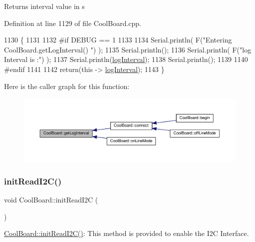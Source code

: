 \begin{DoxyReturn}{Returns}
interval value in s 
\end{DoxyReturn}


Definition at line 1129 of file Cool\+Board.\+cpp.


\begin{DoxyCode}
1130 \{
1131 
1132 \textcolor{preprocessor}{#if DEBUG == 1}
1133 
1134     Serial.println( F(\textcolor{stringliteral}{"Entering CoolBoard.getLogInterval() "}) );
1135     Serial.println();
1136     Serial.println( F(\textcolor{stringliteral}{"log Interval is :"}) );
1137     Serial.println(\hyperlink{class_cool_board_a84bc94413b64973e4aba8c467c97006c}{logInterval});
1138     Serial.println();
1139 
1140 \textcolor{preprocessor}{#endif}
1141 
1142     \textcolor{keywordflow}{return}(\textcolor{keyword}{this} -> \hyperlink{class_cool_board_a84bc94413b64973e4aba8c467c97006c}{logInterval});
1143 \}
\end{DoxyCode}
Here is the caller graph for this function\+:
\nopagebreak
\begin{figure}[H]
\begin{center}
\leavevmode
\includegraphics[width=350pt]{d7/df9/class_cool_board_a7508e029f2ee17bb747ffab599285e0d_icgraph}
\end{center}
\end{figure}
\mbox{\label{class_cool_board_a397b46fadab8f530a8cf4d914c561366}} 
\subsubsection{\texorpdfstring{init\+Read\+I2\+C()}{initReadI2C()}}
{\footnotesize\ttfamily void Cool\+Board\+::init\+Read\+I2C (\begin{DoxyParamCaption}{ }\end{DoxyParamCaption})}

\hyperlink{class_cool_board_a397b46fadab8f530a8cf4d914c561366}{Cool\+Board\+::init\+Read\+I2\+C()}\+: This method is provided to enable the I2C Interface. 

